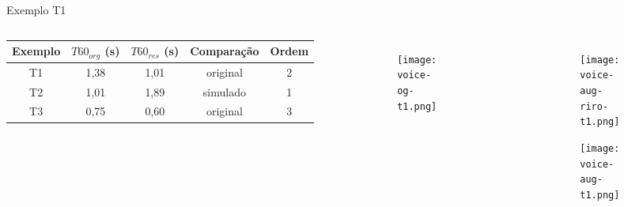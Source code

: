 \begin{frame}{Exemplo T1}
    \begin{columns}
        \begin{table} [H]
            \begin{adjustbox}{width=\columnwidth,center}
                \begin{tabular}{c|c|c|c|c}
            
                    \textbf{Exemplo} & 
                    \textbf{$T60_{org}$ (s)} & 
                    \textbf{$T60_{res}$ (s)} & 
                    \textbf{Comparação} &
                    \textbf{Ordem} \\
                    \hline 
            
                    T1 & 1,38 & 1,01 & original & 2 \\
                    T2 & 1,01 & 1,89 & simulado & 1 \\
                    T3 & 0,75 & 0,60 & original & 3 \\
            
                \end{tabular}
            \end{adjustbox}
        \end{table}

        \begin{figure}
            \begin{subfigure}{\textwidth}
                \centering
                \texttt{[image: voice-og-t1.png]}
            \end{subfigure}
        \end{figure}

        \begin{figure}
            \begin{subfigure}{\textwidth}
                \centering
                \texttt{[image: voice-aug-riro-t1.png]}
            \end{subfigure}
            \begin{subfigure}{\textwidth}
                \centering
                \texttt{[image: voice-aug-t1.png]}
            \end{subfigure}
        \end{figure}
    \end{columns}
\end{frame}

